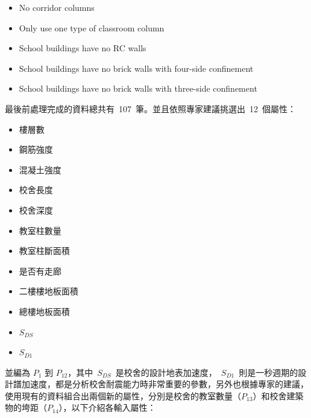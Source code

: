 \begin{itemize}
\item No corridor columns
\item Only use one type of classroom column
\item School buildings have no RC walls
\item School buildings have no brick walls with four-side confinement
\item School buildings have no brick walls with three-side confinement
\end{itemize}

最後前處理完成的資料總共有~107~筆。並且依照專家建議挑選出~12~個屬性：

\begin{multicols}{2}
\begin{itemize}
\item 樓層數
\item 鋼筋強度
\item 混凝土強度
\item 校舍長度
\item 校舍深度
\item 教室柱數量
\item 教室柱斷面積
\item 是否有走廊
\item 二樓樓地板面積
\item 總樓地板面積
\item $S_{DS}$
\item $S_{D1}$
\end{itemize}
\end{multicols}

並編為 $P_1$ 到 $P_{12}$，其中~$S_{DS}$~是校舍的設計地表加速度，~$S_{D1}$~則是一秒週期的設計譜加速度，都是分析校舍耐震能力時非常重要的參數，另外也根據專家的建議，使用現有的資料組合出兩個新的屬性，分別是校舍的教室數量（$P_{13}$）和校舍建築物的垮距（$P_{14}$），以下介紹各輸入屬性：

